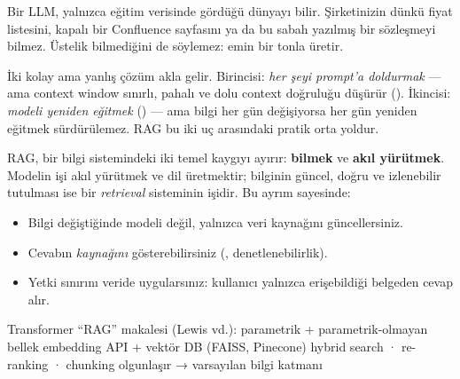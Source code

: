 

Bir LLM, yalnızca eğitim verisinde gördüğü dünyayı bilir. Şirketinizin dünkü
fiyat listesini, kapalı bir Confluence sayfasını ya da bu sabah yazılmış bir
sözleşmeyi bilmez. Üstelik bilmediğini de söylemez: emin bir tonla
 üretir.


İki kolay ama yanlış çözüm akla gelir. Birincisi: \emph{her şeyi prompt'a
doldurmak} --- ama context window sınırlı, pahalı ve dolu context doğruluğu
düşürür (). İkincisi: \emph{modeli yeniden eğitmek}
() --- ama bilgi her gün değişiyorsa her gün yeniden eğitmek
sürdürülemez. RAG bu iki uç arasındaki pratik orta yoldur.

RAG, bir bilgi sistemindeki iki temel kaygıyı ayırır: \textbf{bilmek} ve
\textbf{akıl yürütmek}. Modelin işi akıl yürütmek ve dil üretmektir; bilginin
güncel, doğru ve izlenebilir tutulması ise bir \emph{retrieval} sisteminin
işidir. Bu ayrım sayesinde:

\begin{itemize}
  \item Bilgi değiştiğinde modeli değil, yalnızca veri kaynağını güncellersiniz.
  \item Cevabın \emph{kaynağını} gösterebilirsiniz (, denetlenebilirlik).
  \item Yetki sınırını veride uygularsınız: kullanıcı yalnızca erişebildiği belgeden cevap alır.
\end{itemize}

\begin{timeline}
 Transformer \tlsep {} ``RAG'' makalesi (Lewis vd.): parametrik + parametrik-olmayan bellek \tlsep {} embedding API + vektör DB (FAISS, Pinecone) \tlsep {} hybrid search · re-ranking · chunking olgunlaşır → varsayılan bilgi katmanı
\end{timeline}

